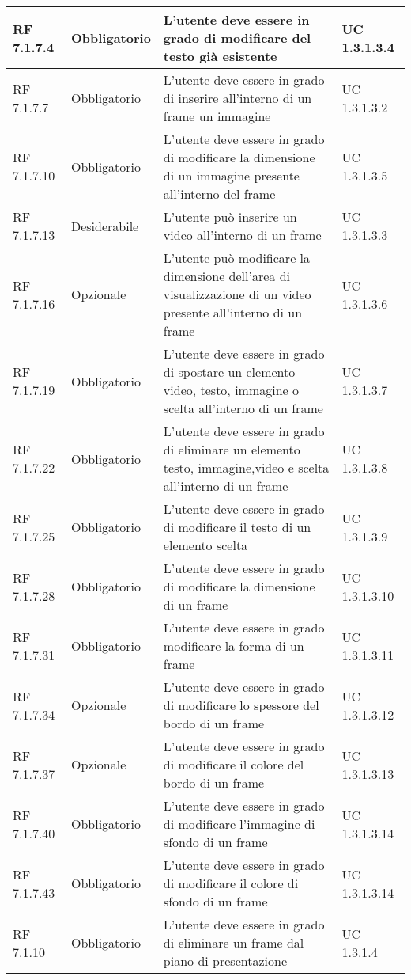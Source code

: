 {\begin{longtable} [c]{| p{2.5cm} | p{2.5cm} | p{6cm} |p{2.5cm}|}
			\hline
			RF 7.1.7.4 & Obbligatorio & L'utente deve essere in grado di modificare del testo già esistente & UC 1.3.1.3.4\\
			\hline
			RF 7.1.7.7 & Obbligatorio & L'utente deve essere in grado di inserire all'interno di un frame un immagine & UC 1.3.1.3.2\\
			\hline
			RF 7.1.7.10 & Obbligatorio & L'utente deve essere in grado di modificare la dimensione di un immagine presente all'interno del frame & UC 1.3.1.3.5\\
			\hline
			RF 7.1.7.13 & Desiderabile & L'utente può inserire un video all'interno di un frame & UC 1.3.1.3.3\\
			\hline
			RF 7.1.7.16 & Opzionale & L'utente può modificare la dimensione dell’area di visualizzazione di un video presente all'interno di un frame  & UC 1.3.1.3.6\\
			\hline
			RF 7.1.7.19 & Obbligatorio & L'utente deve essere in grado di spostare un elemento video, testo, immagine o scelta all'interno di un frame & UC 1.3.1.3.7\\
			\hline
			RF 7.1.7.22 & Obbligatorio & L'utente deve essere in grado di eliminare un elemento testo, immagine,video e scelta all'interno di un frame & UC 1.3.1.3.8\\
			\hline
			RF 7.1.7.25 & Obbligatorio & L'utente deve essere in grado di modificare il testo di un elemento scelta & UC 1.3.1.3.9\\
			\hline
			RF 7.1.7.28 & Obbligatorio & L'utente deve essere in grado di modificare la dimensione di un frame & UC 1.3.1.3.10\\
			\hline
			RF 7.1.7.31 & Obbligatorio & L'utente deve essere in grado modificare la forma di un frame & UC 1.3.1.3.11\\
			\hline
			RF 7.1.7.34 & Opzionale & L'utente deve essere in grado di modificare lo spessore del bordo di un frame & UC 1.3.1.3.12\\
			\hline
			RF 7.1.7.37 & Opzionale & L'utente deve essere in grado di modificare il colore del bordo di un frame & UC 1.3.1.3.13\\
			\hline
			RF 7.1.7.40 & Obbligatorio & L'utente deve essere in grado di modificare l'immagine di sfondo di un frame & UC 1.3.1.3.14\\
			\hline
			RF 7.1.7.43 & Obbligatorio & L'utente deve essere in grado di modificare il colore di sfondo di un frame & UC 1.3.1.3.14\\
			\hline
			RF 7.1.10 & Obbligatorio & L'utente deve essere in grado di eliminare un frame dal piano di presentazione & UC 1.3.1.4\\

\end{longtable}}
